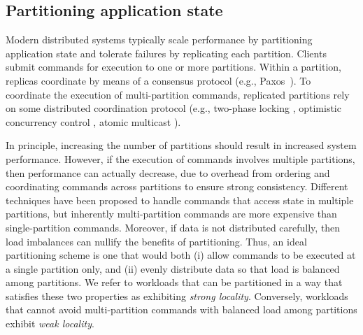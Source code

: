 \subsection{Partitioning application state}

Modern distributed systems typically scale performance by partitioning
application state and tolerate failures by replicating each partition. Clients
submit commands for execution to one or more partitions. Within a partition,
replicas coordinate by means of a consensus protocol (e.g., Paxos~\cite{Lam98}).
To coordinate the execution of multi-partition commands, replicated partitions
rely on some distributed coordination protocol (e.g., two-phase locking
\cite{corbett2013spanner}, optimistic concurrency control \cite{Chang:2008},
atomic multicast \cite{bezerra2014ssmr}).

In principle, increasing the number of partitions should result in increased
system performance. However, if the execution of commands involves multiple
partitions, then performance can actually decrease, due to overhead from
ordering and coordinating commands across partitions to ensure strong
consistency. Different techniques have been proposed to handle commands that
access state in multiple partitions, but inherently multi-partition commands are
more expensive than single-partition commands. Moreover, if data is not
distributed carefully, then load imbalances can nullify the benefits of
partitioning. Thus, an ideal partitioning scheme is one that would both (i)
allow commands to be executed at a single partition only, and (ii) evenly
distribute data so that load is balanced among partitions. We refer to workloads
that can be partitioned in a way that satisfies these two properties as
exhibiting \emph{strong locality}. Conversely, workloads that cannot avoid
multi-partition commands with balanced load among partitions exhibit \emph{weak
locality}.

